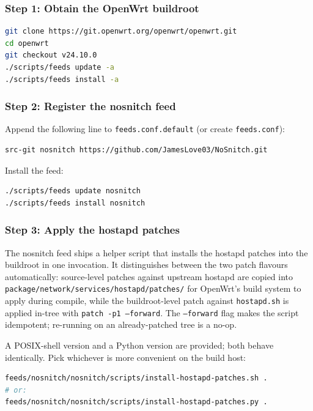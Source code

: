 \subsubsection{Step 1: Obtain the OpenWrt buildroot}

\begin{lstlisting}[language=bash]
git clone https://git.openwrt.org/openwrt/openwrt.git
cd openwrt
git checkout v24.10.0
./scripts/feeds update -a
./scripts/feeds install -a
\end{lstlisting}

\subsubsection{Step 2: Register the nosnitch feed}

Append the following line to \texttt{feeds.conf.default} (or create
\texttt{feeds.conf}):

\begin{lstlisting}
src-git nosnitch https://github.com/JamesLove03/NoSnitch.git
\end{lstlisting}

\noindent Install the feed:

\begin{lstlisting}[language=bash]
./scripts/feeds update nosnitch
./scripts/feeds install nosnitch
\end{lstlisting}

\subsubsection{Step 3: Apply the hostapd patches}
\label{sec:deploy-hostapd-patches}

The nosnitch feed ships a helper script that installs the hostapd
patches into the buildroot in one invocation. It distinguishes between
the two patch flavours automatically: source-level patches against
upstream hostapd are copied into
\texttt{package/network/services/hostapd/patches/} for OpenWrt's build
system to apply during compile, while the buildroot-level patch against
\texttt{hostapd.sh} is applied in-tree with \texttt{patch~-p1
--forward}. The \texttt{--forward} flag makes the script idempotent;
re-running on an already-patched tree is a no-op.

A POSIX-shell version and a Python version are provided; both behave
identically. Pick whichever is more convenient on the build host:

\begin{lstlisting}[language=bash]
feeds/nosnitch/nosnitch/scripts/install-hostapd-patches.sh .
# or:
feeds/nosnitch/nosnitch/scripts/install-hostapd-patches.py .
\end{lstlisting}

